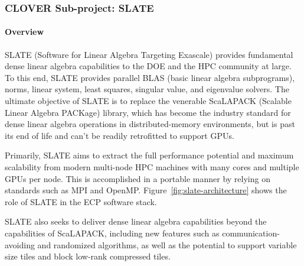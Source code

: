\subsubsection{ CLOVER Sub-project: SLATE}\label{subsubsect:slate}

\paragraph{Overview}

SLATE (Software for Linear Algebra Targeting Exascale)
provides fundamental dense linear algebra capabilities
to the DOE and the HPC community at large.
To this end, SLATE provides
parallel BLAS (basic linear algebra subprograms), norms,
linear system, least squares,
singular value, and eigenvalue solvers.
%
The ultimate objective of SLATE is to replace the
venerable ScaLAPACK (Scalable Linear Algebra PACKage) library,
which has become the industry standard for dense linear algebra operations
in distributed-memory environments, but is past its end of life
and can't be readily retrofitted to support GPUs.

Primarily, SLATE aims to extract the full performance potential and maximum
scalability from modern multi-node HPC machines with
many cores and multiple GPUs per node.
This is accomplished in a portable manner by relying on standards
such as MPI and OpenMP.
%
Figure~\ref{fig:slate-architecture} shows the role of SLATE
in the ECP software stack.

SLATE also seeks to deliver dense linear algebra capabilities
beyond the capabilities of ScaLAPACK,
including new features such as communication-avoiding
and randomized algorithms, as well as the potential to
support variable size tiles and block low-rank compressed tiles.

